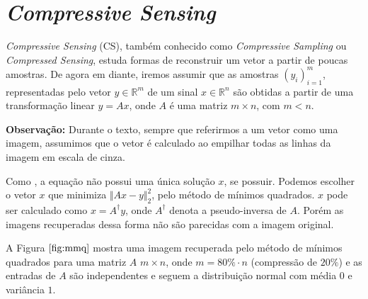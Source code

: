 \chapter{\textit{Compressive Sensing}}

\textit{Compressive Sensing} (CS), também conhecido como \textit{Compressive Sampling} ou \textit{Compressed Sensing},  estuda formas de reconstruir um vetor a partir de poucas amostras. De agora em diante, iremos assumir que as amostras $(y_i)_{i = 1}^m$, representadas pelo vetor $y \in \mathbb{R}^m$ de um sinal $x \in \mathbb{R}^n$ são obtidas a partir de uma transformação linear $y = Ax$, onde $A$ é uma matriz $m \times n$, com $m < n$.

{\bf Observação:} Durante o texto, sempre que referirmos a um vetor como uma imagem, assumimos que o vetor é calculado ao empilhar todas as linhas da imagem em escala de cinza.

Como , a equação não possui uma única solução $x$, se possuir. Podemos escolher o vetor $x$ que minimiza $\Vert Ax - y \Vert_2^2$, pelo método de mínimos quadrados. $x$ pode ser calculado como $x = A^{\dagger} y$, onde $A^{\dagger}$ denota a pseudo-inversa de $A$. Porém as imagens recuperadas dessa forma não são parecidas com a imagem original.

A Figura $\ref{fig:mmq}$ mostra uma imagem recuperada pelo método de mínimos quadrados para uma matriz $A$ $m \times n$, onde $m = 80 \% \cdot n$ (compressão de $20\%$) e as entradas de $A$ são independentes e seguem a distribuição normal com média $0$ e variância $1$.


